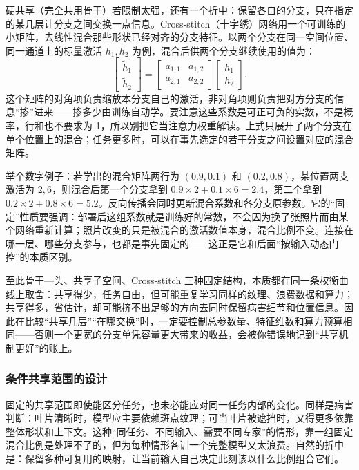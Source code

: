 硬共享（完全共用骨干）若限制太强，还有一个折中：保留各自的分支，只在指定的某几层让分支之间交换一点信息。Cross-stitch（十字绣）网络用一个可训练的小矩阵，去线性混合那些形状已经对齐的分支特征。以两个分支在同一空间位置、同一通道上的标量激活 $h_1,h_2$ 为例，混合后供两个分支继续使用的值为：
\begin{equation}
  \begin{bmatrix}
    \widetilde h_1\\ \widetilde h_2
  \end{bmatrix}
  =
  \begin{bmatrix}
    a_{1,1}&a_{1,2}\\a_{2,1}&a_{2,2}
  \end{bmatrix}
  \begin{bmatrix}
    h_1\\h_2
  \end{bmatrix}.
  \label{eq:ket-sharing-cross-stitch}
\end{equation}
这个矩阵的对角项负责缩放本分支自己的激活，非对角项则负责把对方分支的信息“掺”进来——掺多少由训练自动学。要注意这些系数是可正可负的实数，不是概率，行和也不要求为 1，所以别把它当注意力权重解读。上式只展开了两个分支在单个位置上的混合；任务更多时，可以在事先选定的若干分支之间设置对应的混合矩阵。

举个数字例子：若学出的混合矩阵两行为 $(0.9,0.1)$ 和 $(0.2,0.8)$，某位置两支激活为 $2,6$，则混合后第一个分支拿到 $0.9\times2+0.1\times6=2.4$，第二个拿到 $0.2\times2+0.8\times6=5.2$。反向传播会同时更新混合系数和各分支原参数。它的“固定”性质要强调：部署后这组系数就是训练好的常数，不会因为换了张照片而由某个网络重新计算；照片改变的只是被混合的激活数值本身，混合比例不变。连接在哪一层、哪些分支参与，也都是事先固定的——这正是它和后面“按输入动态门控”的本质区别。

至此骨干—头、共享子空间、Cross-stitch 三种固定结构，本质都在同一条权衡曲线上取舍：共享得少，任务自由，但可能重复学习同样的纹理、浪费数据和算力；共享得多，省估计，却可能挤不出足够的方向去同时保留病害细节和位置信息。因此在比较“共享几层”“在哪交换”时，一定要控制总参数量、特征维数和算力预算相同——否则一个更宽的分支单凭容量更大带来的收益，会被你错误地记到“共享机制更好”的账上。

\subsubsection{条件共享范围的设计}
\label{sec:ket-sharing-conditional}

固定的共享范围即使能区分任务，也未必能应对同一任务内部的变化。同样是病害判断：叶片清晰时，模型应主要依赖斑点纹理；可当叶片被遮挡时，又得更多依靠整体形状和上下文。这种“同任务、不同输入、需要不同专家”的情形，靠一组固定混合比例是处理不了的，但为每种情形各训一个完整模型又太浪费。自然的折中是：保留多种可复用的映射，让当前输入自己决定此刻该以什么比例组合它们。

